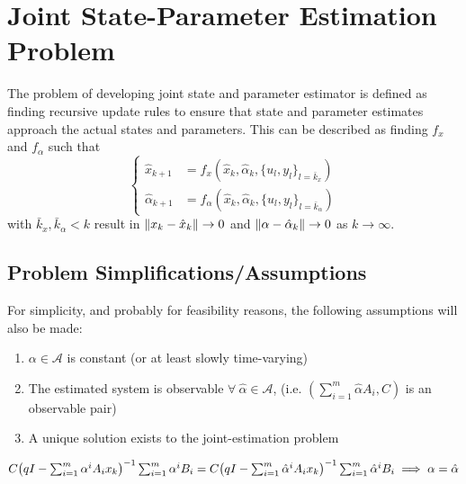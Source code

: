 \documentclass[]{article}
\begin{document}
\newpage
\section{Joint State-Parameter Estimation Problem}
The problem of developing joint state and parameter estimator is defined as finding recursive update rules to ensure that state and parameter estimates approach the actual states and parameters. This can be described as finding $f_x$ and $f_\alpha$ such that
\begin{equation}\label{eq:est_pblm_statement}
	\begin{cases}
		\hat{x}_{k+1} 		&= f_x(\hat{x}_k, \hat{\alpha}_k, \{u_l, y_l\}_{l=\bar{k}_x})\\
		\hat{\alpha}_{k+1} 	&= f_\alpha(\hat{x}_k, \hat{\alpha}_k, \{u_l, y_l\}_{l=\bar{k}_\alpha})
	\end{cases}
\end{equation}
with $\bar{k}_x, \bar{k}_\alpha < k$ result in $\norm{x_k - \hat{x}_k} \to 0$ and $\norm{\alpha - \hat{\alpha}_k} \to 0$ as $k \to \infty$.

\subsection{Problem Simplifications/Assumptions \cite{beelen2017joint}}
For simplicity, and probably for feasibility reasons, the following assumptions will also be made:

\begin{enumerate}
	\item $\alpha \in \mathcal{A}$ is constant (or at least slowly time-varying)
	\item The estimated system is observable $\forall \ \hat{\alpha} \in \mathcal{A}$, (i.e. $(\sum_{i=1}^m \hat{\alpha} A_i, C)$ is an observable pair)
	\item A unique solution exists to the joint-estimation problem
\end{enumerate}
$C \qty(q I - \sum_{i=1}^{m} \alpha^i A_i x_k)^{-1} \sum_{i=1}^m \alpha^i B_i \\= C \qty(q I - \sum_{i=1}^{m} \hat{\alpha}^i A_i x_k)^{-1} \sum_{i=1}^m \hat{\alpha}^i B_i \implies \alpha = \hat{\alpha}$
\end{document}
